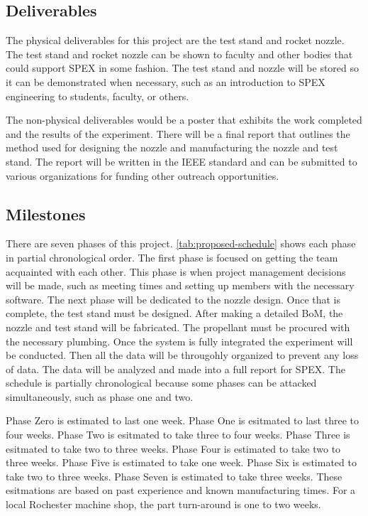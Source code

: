 \documentclass[conference]{IEEEtran} %
\begin{document}
\subsection{Deliverables}\label{subsec:deliverables}
The physical deliverables for this project are the test stand and rocket nozzle. The test stand and rocket nozzle can be shown to faculty and other
bodies that could support SPEX in some fashion. The test stand and nozzle will be stored so it can be demonstrated when necessary, such as an introduction to SPEX
engineering to students, faculty, or others.

The non-physical deliverables would be a poster that exhibits the work completed and the results of the experiment. There will be a final report that outlines
the method used for designing the nozzle and manufacturing the nozzle and test stand. The report will be written in the IEEE standard and can be submitted to various
organizations for funding other outreach opportunities.

\subsection{Milestones}\label{subsec:milestones}
There are seven phases of this project. \autoref{tab:proposed-schedule} shows each phase in partial chronological order. The first phase is focused on getting the team acquainted with
each other. This phase is when project management decisions will be made, such as meeting times and setting up members with the necessary software. The next phase will be dedicated
to the nozzle design. Once that is complete, the test stand must be designed. After making a detailed BoM, the nozzle and test stand will be fabricated. The propellant must be
procured with the necessary plumbing. Once the system is fully integrated the experiment will be conducted. Then all the data will be througohly organized to prevent any loss of
data. The data will be analyzed and made into a full report for SPEX. The schedule is partially chronological because some phases can be attacked simultaneously, such as phase one and two. 

Phase Zero is estimated to last one week. Phase One is esitmated to last three to four weeks. Phase Two is esitmated to take three to four weeks. Phase Three is esitmated to take
two to three weeks. Phase Four is estimated to take two to three weeks. Phase Five is estimated to take one week. Phase Six is estimated to take two to three weeks. Phase Seven
is estimated to take three weeks. These esitmations are based on past experience and known manufacturing times. For a local Rochester machine shop, the part turn-around is one to two weeks.
\end{document}
